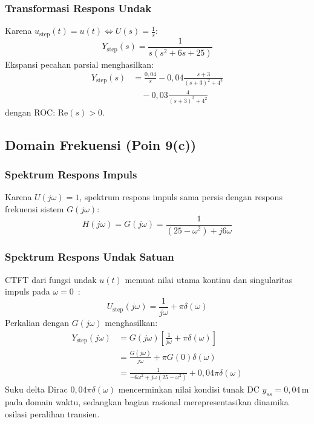 \documentclass[journal]{IEEEtran}
\begin{document}
\subsubsection{Transformasi Respons Undak}
Karena $u_{\text{step}}(t) = u(t) \iff U(s) = \frac{1}{s}$:
\begin{equation}
    Y_{\text{step}}(s) = \frac{1}{s(s^2 + 6s + 25)}
    \label{eq:Y_step_s}
\end{equation}
Ekspansi pecahan parsial menghasilkan:
\begin{align}
    Y_{\text{step}}(s) &= \frac{0{,}04}{s} - 0{,}04 \frac{s + 3}{(s + 3)^2 + 4^2} \nonumber \\
    &\quad - 0{,}03 \frac{4}{(s + 3)^2 + 4^2}
    \label{eq:Y_step_pfd}
\end{align}
dengan ROC: $\text{Re}(s) > 0$.

\subsection{Domain Frekuensi (Poin 9(c))}
\subsubsection{Spektrum Respons Impuls}
Karena $U(j\omega) = 1$, spektrum respons impuls sama persis dengan respons frekuensi sistem $G(j\omega)$:
\begin{equation}
    H(j\omega) = G(j\omega) = \frac{1}{(25 - \omega^2) + j 6\omega}
    \label{eq:H_jw}
\end{equation}

\subsubsection{Spektrum Respons Undak Satuan}
CTFT dari fungsi undak $u(t)$ memuat nilai utama kontinu dan singularitas impuls pada $\omega = 0$~\cite{oppenheim1997signals}:
\begin{equation}
    U_{\text{step}}(j\omega) = \frac{1}{j\omega} + \pi \delta(\omega)
\end{equation}
Perkalian dengan $G(j\omega)$ menghasilkan:
\begin{align}
    Y_{\text{step}}(j\omega) &= G(j\omega) \left[ \frac{1}{j\omega} + \pi \delta(\omega) \right] \nonumber \\
    &= \frac{G(j\omega)}{j\omega} + \pi G(0) \delta(\omega) \nonumber \\
    &= \frac{1}{-6\omega^2 + j\omega (25 - \omega^2)} + 0{,}04 \pi \delta(\omega)
    \label{eq:Y_step_jw}
\end{align}
Suku delta Dirac $0{,}04 \pi \delta(\omega)$ mencerminkan nilai kondisi tunak DC $y_{ss} = 0{,}04\,\text{m}$ pada domain waktu, sedangkan bagian rasional merepresentasikan dinamika osilasi peralihan transien.
\end{document}
